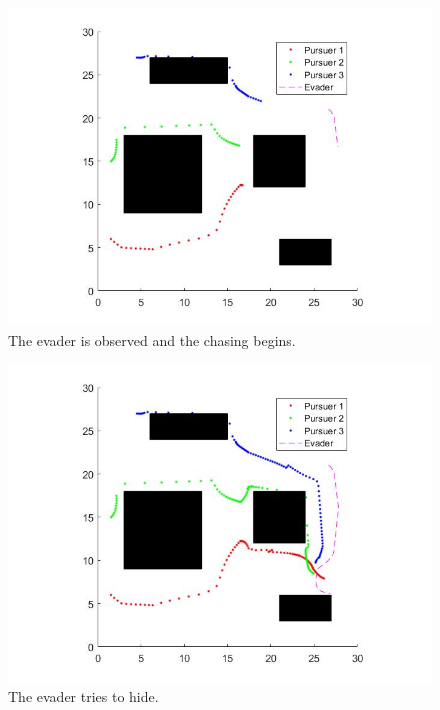 \documentclass[ebook,11pt] {kth-mag}
\begin{document}
\begin{figure}[H]
\includegraphics[scale=0.4]{c1-1}
\centering
\caption{The evader is observed and the chasing begins.}
\end{figure}

\begin{figure}[H]
\includegraphics[scale=0.4]{c1-2}
\centering
\caption{The evader tries to hide.}
\end{figure}
\end{document}
